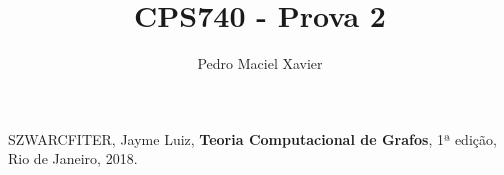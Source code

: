 \documentclass{homework}
\title{CPS740 - Prova 2}
\author{Pedro Maciel Xavier}
\begin{document}
	
	
	\quest
	
	\begin{thebibliography}{10}
		 SZWARCFITER, Jayme Luiz, \textbf{Teoria Computacional de Grafos}, 1ª edição, Rio de Janeiro, 2018.
	\end{thebibliography}
	\newpage
	\let\clearpage\relax
\end{document}
